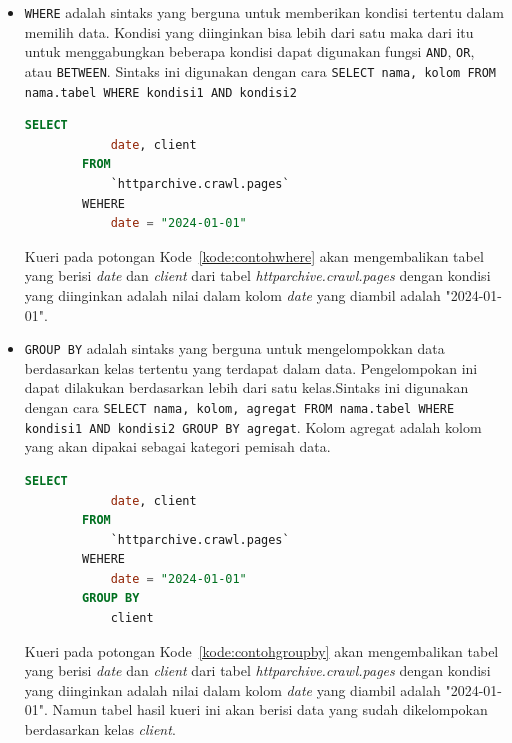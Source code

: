 \begin{itemize}
    \item \verb|WHERE| adalah sintaks yang berguna untuk memberikan kondisi tertentu dalam memilih data. Kondisi yang diinginkan bisa lebih dari satu maka dari itu untuk menggabungkan beberapa kondisi dapat digunakan fungsi \verb|AND|, \verb|OR|, atau \verb|BETWEEN|. Sintaks ini digunakan dengan cara \verb|SELECT nama, kolom FROM nama.tabel WHERE kondisi1 AND kondisi2|
        \begin{lstlisting}[language=SQL, caption=contoh penggunaan sintaks \lstinline|WHERE|, label=kode:contohwhere]
        SELECT
            date, client
        FROM
            `httparchive.crawl.pages`
        WEHERE
            date = "2024-01-01"
    \end{lstlisting}
    Kueri pada potongan Kode~\ref{kode:contohwhere} akan mengembalikan tabel yang berisi \textit{date} dan \textit{client} dari tabel \textit{httparchive.crawl.pages} dengan kondisi yang diinginkan adalah nilai dalam kolom \textit{date} yang diambil adalah "2024-01-01".
    
    \item \verb|GROUP BY| adalah sintaks yang berguna untuk mengelompokkan data berdasarkan kelas tertentu yang terdapat dalam data. Pengelompokan ini dapat dilakukan berdasarkan lebih dari satu kelas.Sintaks ini digunakan dengan cara \verb|SELECT nama, kolom, agregat FROM nama.tabel WHERE kondisi1 AND kondisi2 GROUP BY agregat|. Kolom agregat adalah kolom yang akan dipakai sebagai kategori pemisah data.
        \begin{lstlisting}[language=SQL, caption=contoh penggunaan sintaks \lstinline|GROUP BY|, label=kode:contohgroupby]
        SELECT
            date, client
        FROM
            `httparchive.crawl.pages`
        WEHERE
            date = "2024-01-01"
        GROUP BY
            client
    \end{lstlisting}
     Kueri pada potongan Kode~\ref{kode:contohgroupby} akan mengembalikan tabel yang berisi \textit{date} dan \textit{client} dari tabel \textit{httparchive.crawl.pages} dengan kondisi yang diinginkan adalah nilai dalam kolom \textit{date} yang diambil adalah "2024-01-01". Namun tabel hasil kueri ini akan berisi data yang sudah dikelompokan berdasarkan kelas \textit{client}.
     

\end{itemize}
